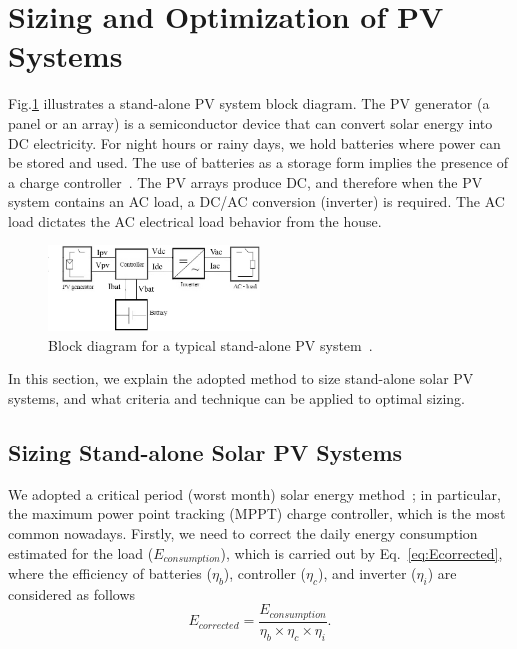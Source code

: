 \documentclass[journal]{IEEEtran}
\begin{document}
\section{Sizing and Optimization of PV Systems}
\label{sec:Background}

Fig.\ref{fig:blockdiagram} illustrates a stand-alone PV system block diagram. The PV generator (a panel or an array) is a semiconductor device that can convert solar energy into DC electricity. For night hours or rainy days, we hold batteries where power can be stored and used. The use of batteries as a storage form implies the presence of a charge controller~\cite{Hansen}. The PV arrays produce DC, and therefore when the PV system contains an AC load, a DC/AC conversion (inverter) is required. The AC load dictates the AC electrical load behavior from the house.
%
\begin{figure}[h]
\hspace*{-1cm}\includegraphics[width=0.5\textwidth]{blockdiagramPVS2_rev}
\centering
\caption{Block diagram for a typical stand-alone PV system~\cite{Hansen}.}
\label{fig:blockdiagram} 
\end{figure}

In this section, we explain the adopted method to size stand-alone solar PV systems, and what criteria and technique can be applied to optimal sizing. 

\subsection{Sizing Stand-alone Solar PV Systems}
\label{sec:sizing}

We adopted a critical period (worst month) solar energy method~\cite{Pinho}; in particular, the maximum power point tracking (MPPT) charge controller, which is the most common nowadays. Firstly, we need to correct the daily energy consumption estimated for the load ($E_{consumption}$), which is carried out by Eq.~\eqref{eq:Ecorrected}, where the efficiency of batteries ($\eta_{b}$), controller ($\eta_{c}$), and inverter ($\eta_{i}$) are considered as follows
%
\begin{equation}
\label{eq:Ecorrected}
E_{corrected} = \dfrac{E_{consumption}}{\eta_{b} \times \eta_{c} \times \eta_{i} }.
\end{equation}
\end{document}
